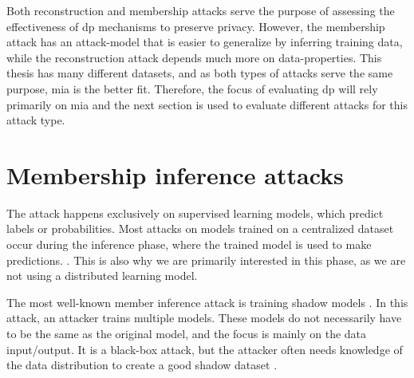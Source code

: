 Both reconstruction and membership attacks serve the purpose of assessing the effectiveness of \gls{dp} mechanisms to preserve privacy.
However, the membership attack has an attack-model that is easier to generalize by inferring training data, while the reconstruction attack depends much more on data-properties.
This thesis has many different datasets, and as both types of attacks serve the same purpose, \gls{mia} is the better fit. \newline
Therefore, the focus of evaluating \gls{dp} will rely primarily on \gls{mia} and the next section is used to evaluate different attacks for this attack type.


\section{Membership inference attacks}
The attack happens exclusively on supervised learning models, which predict labels or probabilities.
Most attacks on models trained on a centralized dataset occur during the inference phase, where the trained model is used to make predictions. \citep{rigaki_survey_2021}.
This is also why we are primarily interested in this phase, as we are not using a distributed learning model.

The most well-known member inference attack is training shadow models \citep{rigaki_survey_2021}.
In this attack, an attacker trains multiple models.
These models do not necessarily have to be the same as the original model, and the focus is mainly on the data input/output.
It is a black-box attack, but the attacker often needs knowledge of the data distribution to create a good shadow dataset \citep{rigaki_survey_2021}.

